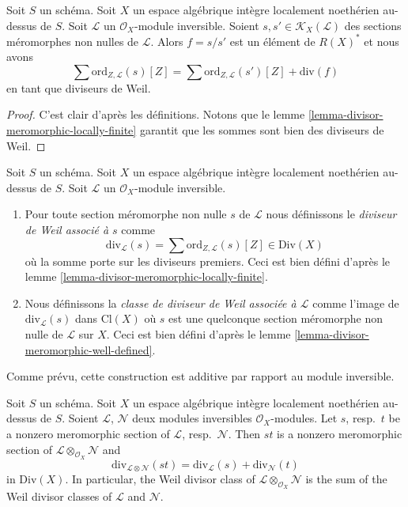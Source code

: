\begin{lemma}
\label{lemma-divisor-meromorphic-well-defined}
Soit $S$ un schéma. Soit $X$ un espace algébrique intègre localement noethérien
au-dessus de $S$. Soit $\mathcal{L}$ un $\mathcal{O}_X$-module inversible.
Soient $s, s' \in \mathcal{K}_X(\mathcal{L})$ des sections méromorphes
non nulles de $\mathcal{L}$. Alors $f = s/s'$
est un élément de $R(X)^*$ et nous avons
$$
\sum \text{ord}_{Z, \mathcal{L}}(s)[Z]
=
\sum \text{ord}_{Z, \mathcal{L}}(s')[Z]
+
\text{div}(f)
$$
en tant que diviseurs de Weil.
\end{lemma}

\begin{proof}
C'est clair d'après les définitions.
Notons que le lemme \ref{lemma-divisor-meromorphic-locally-finite}
garantit que les sommes sont bien des diviseurs de Weil.
\end{proof}

\begin{definition}
\label{definition-divisor-invertible-sheaf}
Soit $S$ un schéma. Soit $X$ un espace algébrique intègre localement noethérien
au-dessus de $S$. Soit $\mathcal{L}$ un $\mathcal{O}_X$-module inversible.
\begin{enumerate}
\item Pour toute section méromorphe non nulle $s$ de $\mathcal{L}$
nous définissons le {\it diviseur de Weil associé à $s$} comme
$$
\text{div}_\mathcal{L}(s) =
\sum \text{ord}_{Z, \mathcal{L}}(s) [Z] \in \text{Div}(X)
$$
où la somme porte sur les diviseurs premiers. Ceci est bien défini d'après
le lemme \ref{lemma-divisor-meromorphic-locally-finite}.
\item Nous définissons la {\it classe de diviseur de Weil associée à $\mathcal{L}$}
comme l'image de $\text{div}_\mathcal{L}(s)$ dans $\text{Cl}(X)$
où $s$ est une quelconque section méromorphe non nulle de $\mathcal{L}$ sur $X$.
Ceci est bien défini d'après
le lemme \ref{lemma-divisor-meromorphic-well-defined}.
\end{enumerate}
\end{definition}

\noindent
Comme prévu, cette construction est additive par rapport au module inversible.

\begin{lemma}
\label{lemma-c1-additive}
Soit $S$ un schéma. Soit $X$ un espace algébrique intègre localement noethérien
au-dessus de $S$. Soient $\mathcal{L}$, $\mathcal{N}$ deux modules inversibles
$\mathcal{O}_X$-modules. Let $s$, resp.\ $t$ be a nonzero meromorphic section
of $\mathcal{L}$, resp.\ $\mathcal{N}$. Then $st$ is a nonzero
meromorphic section of $\mathcal{L} \otimes_{\mathcal{O}_X} \mathcal{N}$ and
$$
\text{div}_{\mathcal{L} \otimes \mathcal{N}}(st)
=
\text{div}_\mathcal{L}(s) + \text{div}_\mathcal{N}(t)
$$
in $\text{Div}(X)$. In particular, the Weil divisor class of
$\mathcal{L} \otimes_{\mathcal{O}_X} \mathcal{N}$ is the sum
of the Weil divisor classes of $\mathcal{L}$ and $\mathcal{N}$.
\end{lemma}

